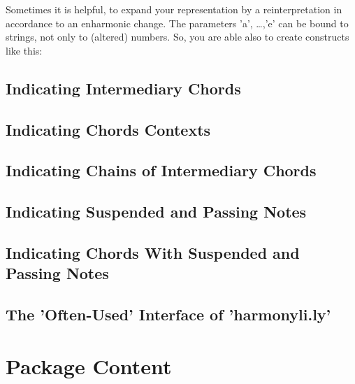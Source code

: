\documentclass[
  DIV=calc,
  BCOR=5mm,
  12pt,
  headings=small,
  oneside,
  abstract=true,
  toc=bib,
  xcolor=dvipsnames,
  openany,
  ngerman,english]{scrartcl}
\begin{document}
Sometimes it is helpful, to expand your representation by a reinterpretation in
accordance to an enharmonic change. The parameters 'a', \ldots,'e' can be bound
to strings, not only to (altered) numbers. So, you are able also to create
constructs like this:

\begin{center}
\end{center}

\subsection{Indicating Intermediary Chords}

\subsection{Indicating Chords Contexts}

\subsection{Indicating Chains of Intermediary Chords}

\subsection{Indicating Suspended and Passing Notes}

\subsection{Indicating Chords With Suspended and Passing Notes}



\subsection{The 'Often-Used' Interface of 'harmonyli.ly'}

\section{Package Content}
















%
\printnomenclature


\end{document}
